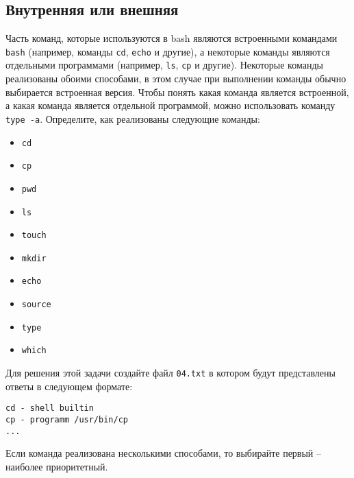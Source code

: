 \documentclass{article}
\begin{document}
\subsection{Внутренняя или внешняя}
Часть команд, которые используются в bash являются встроенными командами \texttt{bash} (например, команды \texttt{cd}, \texttt{echo} и другие), а некоторые команды являются отдельными программами (например, \texttt{ls}, \texttt{cp} и другие). Некоторые команды реализованы обоими способами, в этом случае при выполнении команды обычно выбирается встроенная версия. Чтобы понять какая команда является встроенной, а какая команда является отдельной программой, можно использовать команду \texttt{type -a}. Определите, как реализованы следующие команды:
\begin{multicols}{2}
\begin{itemize}
\item \texttt{cd}
\item \texttt{cp}
\item \texttt{pwd}
\item \texttt{ls}
\item \texttt{touch}
\item \texttt{mkdir}
\item \texttt{echo}
\item \texttt{source}
\item \texttt{type}
\item \texttt{which}
\end{itemize}
\end{multicols}
\noindent Для решения этой задачи создайте файл \texttt{04.txt} в котором будут представлены ответы в следующем формате:
\begin{lstlisting}
cd - shell builtin
cp - programm /usr/bin/cp
...
\end{lstlisting}
Если команда реализована несколькими способами, то выбирайте первый -- наиболее приоритетный.
\end{document}
